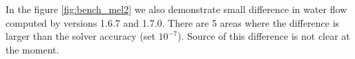 
In the figure \ref{fig:bench_mel2} we also demonstrate small difference in water flow computed by versions 1.6.7 and 1.7.0. 
There are 5 areas where the difference is larger than the solver accuracy (set $10^{-7}$). Source of this difference 
is not clear at the moment.

